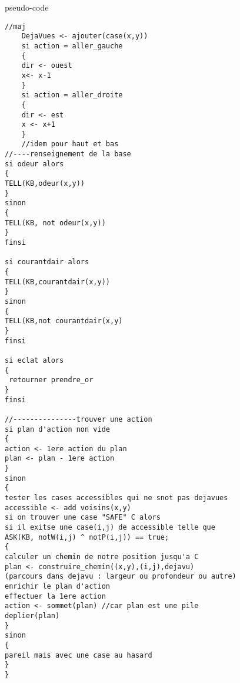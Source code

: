 \documentclass{article}
\begin{document}
pseudo-code\\
\begin{verbatim}
//maj
	DejaVues <- ajouter(case(x,y))
	si action = aller_gauche
	{
	dir <- ouest
	x<- x-1
	}	
	si action = aller_droite
	{
	dir <- est
	x <- x+1
	}
	//idem pour haut et bas
//----renseignement de la base
si odeur alors
{
TELL(KB,odeur(x,y))
}
sinon
{
TELL(KB, not odeur(x,y))
}
finsi

si courantdair alors
{
TELL(KB,courantdair(x,y))
}
sinon
{
TELL(KB,not courantdair(x,y)
}
finsi

si eclat alors
{
 retourner prendre_or
}
finsi
 
//---------------trouver une action
si plan d'action non vide
{
action <- 1ere action du plan
plan <- plan - 1ere action
}
sinon
{
tester les cases accessibles qui ne snot pas dejavues
accessible <- add voisins(x,y)
si on trouver une case "SAFE" C alors
si il exitse une case(i,j) de accessible telle que
ASK(KB, notW(i,j) ^ notP(i,j)) == true;
{
calculer un chemin de notre position jusqu'a C
plan <- construire_chemin((x,y),(i,j),dejavu) 
(parcours dans dejavu : largeur ou profondeur ou autre)
enrichir le plan d'action
effectuer la 1ere action
action <- sommet(plan) //car plan est une pile
deplier(plan)
}
sinon
{
pareil mais avec une case au hasard
}
}
\end{verbatim}
\end{document}
